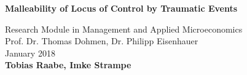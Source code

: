 \documentclass[12pt,a4paper,fleqn]{article}
\begin{document}
	\begin{titlepage}
		\begin{center}
			\vspace*{35mm}
			{\bfseries\Large{Malleability of Locus of Control by Traumatic Events}\\
			\vspace{25mm}}
			\begin{spacing}{1.3}
				\large Research Module in Management and Applied Microeconomics\\
				\vspace{65mm}
			   Prof. Dr. Thomas Dohmen, Dr. Philipp Eisenhauer \\
				\vspace{10mm}
				January 2018   \\
				\textbf{Tobias Raabe, Imke Strampe} \\
			\end{spacing}
		\end{center}
	\end{titlepage}
\tableofcontents

\pagebreak

\listoffigures  {} \clearpage 
\listoftables  {} \clearpage 

\pagebreak

\end{document}
